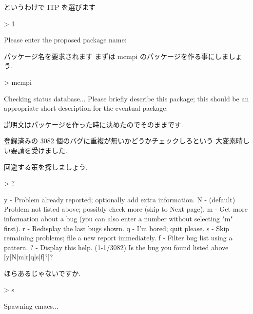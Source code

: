 \documentclass[mingoth,a4paper]{jsarticle}
\begin{document}
\begin{commandline}
というわけで ITP を選びます

\begin{commandline}
> 1

Please enter the proposed package name:
\end{commandline}

パッケージ名を要求されます
まずは mcmpi のパッケージを作る事にしましょう.

\begin{commandline}
> mcmpi

Checking status database...
Please briefly describe this package; this should be an appropriate short
description for the eventual package:
\end{commandline}

説明文はパッケージを作った時に決めたのでそのままです.


登録済みの 3082 個のバグに重複が無いかどうかチェックしろという
大変素晴しい要請を受けました.

回避する策を探しましょう.

\begin{commandline}
> ?

y - Problem already reported; optionally add extra information.
N - (default) Problem not listed above; possibly check more (skip to Next
    page).
m - Get more information about a bug (you can also enter a number without
    selecting "m" first).
r - Redisplay the last bugs shown.
q - I'm bored; quit please.
s - Skip remaining problems; file a new report immediately.
f - Filter bug list using a pattern.
? - Display this help.
(1-1/3082) Is the bug you found listed above [y|N|m|r|q|s|f|?]?
\end{commandline}

ほらあるじゃないですか.

\begin{commandline}
> s

Spawning emacs...
\end{commandline}


\end{commandline}
\end{document}
